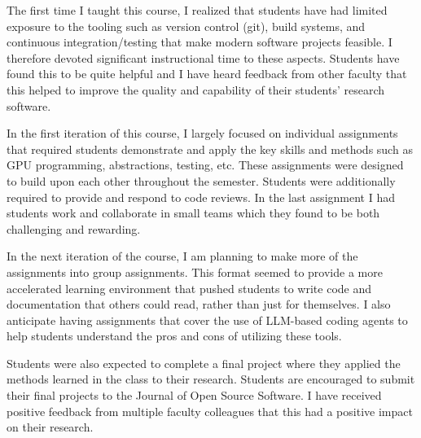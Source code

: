 \begin{description}
The first time I taught this course, I realized that students have had limited exposure to the tooling such as version control (git), build systems, and continuous integration/testing that make modern software projects feasible. I therefore devoted significant instructional time to these aspects. Students have found this to be quite helpful and I have heard feedback from other faculty that this helped to improve the quality and capability of their students' research software.

In the first iteration of this course, I largely focused on individual assignments that required students demonstrate and apply the key skills and methods such as GPU programming, abstractions, testing, etc. These assignments were designed to build upon each other throughout the semester. Students were additionally required to provide and respond to code reviews. In the last assignment I had students work and collaborate in small teams which they found to be both challenging and rewarding.

In the next iteration of the course, I am planning to make more of the assignments into group assignments. This format seemed to provide a more accelerated learning environment that pushed students to write code and documentation that others could read, rather than just for themselves. I also anticipate having assignments that cover the use of LLM-based coding agents to help students understand the pros and cons of utilizing these tools.

Students were also expected to complete a final project where they applied the methods learned in the class to their research. Students are encouraged to submit their final projects to the Journal of Open Source Software. I have received positive feedback from multiple faculty colleagues that this had a positive impact on their research.

\end{description}
